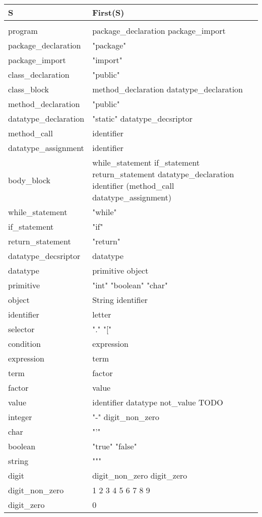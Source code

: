 \documentclass[a4paper,10pt]{article}
\begin{document}
\begin{tabular}{p{4cm}l}
	S & First(S) \\ \hline
	& \\
	program & package\_declaration package\_import  \\
	package\_declaration & "package" \\
	package\_import & "import" \\
	class\_declaration & "public" \\
	class\_block & method\_declaration datatype\_declaration \\
	method\_declaration & "public" \\
	datatype\_declaration & "static" datatype\_decsriptor \\
	method\_call & identifier \\
	datatype\_assignment & identifier \\
	body\_block & while\_statement if\_statement return\_statement datatype\_declaration identifier (method\_call datatype\_assignment) \\
	while\_statement & "while" \\
	if\_statement & "if" \\
	return\_statement & "return" \\
	datatype\_decsriptor & datatype \\
	datatype & primitive object \\
	primitive & "int" "boolean" "char" \\
	object & String identifier \\
	identifier & letter \\
	selector & "." "[" \\
	condition & expression \\
	expression & term \\
	term & factor \\
	factor & value \\
	value & identifier datatype not\_value TODO \\
	integer & "-" digit\_non\_zero \\
	char & "'"\\
	boolean & "true" "false" \\
	string & """ \\
	digit & digit\_non\_zero digit\_zero \\
	digit\_non\_zero & 1 2 3 4 5 6 7 8 9 \\
	digit\_zero & 0 \\
\end{tabular}
\end{document}
